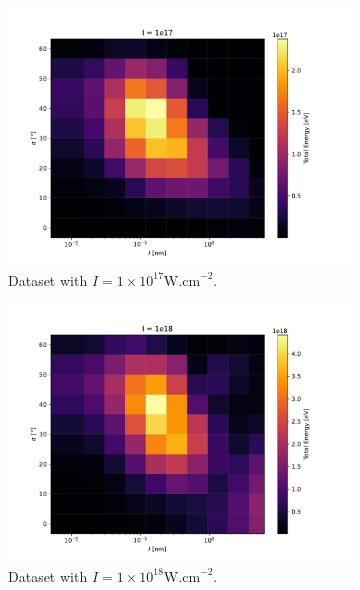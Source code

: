 \begin{figure}[ht]
	\centering
	\begin{subfigure}{0.49\textwidth}
		\centering
		\includegraphics[width=\textwidth]{figures/I_1e17_cut_10}
		\caption{Dataset with $I = 1 \times 10^{17} \mathrm{W.cm}^{-2}$.}
		\label{fig:dataset2-a}
	\end{subfigure}
	\hfill
	\begin{subfigure}{0.49\textwidth}
		\centering
		\includegraphics[width=\textwidth]{figures/I_1e18_cut_10}
		\caption{Dataset with $I = 1 \times 10^{18} \mathrm{W.cm}^{-2}$.}
		\label{fig:datset2-b}
	\end{subfigure}
	\begin{subfigure}{0.49\textwidth}

\end{subfigure}
\end{figure}
